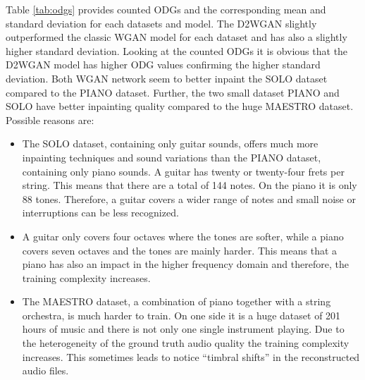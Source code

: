 \documentclass{article} %
\begin{document}
Table \ref{tab:odgs} provides counted ODGs and the corresponding mean and standard deviation for each datasets and model. The D2WGAN slightly outperformed the classic WGAN model for each dataset and has also a slightly higher standard deviation. Looking at the counted ODGs it is obvious that the D2WGAN model has higher ODG values confirming the higher standard deviation. Both WGAN network seem to better inpaint the SOLO dataset compared to the PIANO dataset. Further, the two small dataset PIANO and SOLO have better inpainting quality compared to the huge MAESTRO dataset. Possible reasons are:
\begin{itemize}
    \item The SOLO dataset, containing only guitar sounds, offers much more inpainting techniques and sound variations than the PIANO dataset, containing only piano sounds. A guitar has twenty or twenty-four frets per string. This means that there are a total of 144 notes. On the piano it is only 88 tones. Therefore, a guitar covers a wider range of notes and small noise or interruptions can be less recognized.
    \item A guitar only covers four octaves where the tones are softer, while a piano covers seven octaves and the tones are mainly harder. This means that a piano has also an impact in the higher frequency domain and therefore, the training complexity increases.
    \item The MAESTRO dataset, a combination of piano together with a string orchestra, is much harder to train. On one side it is a huge dataset of 201 hours of music and there is not only one single instrument playing. Due to the heterogeneity of the ground truth audio quality the training complexity increases. This sometimes leads to notice “timbral shifts” in the reconstructed audio files.
\end{itemize}
\end{document}

